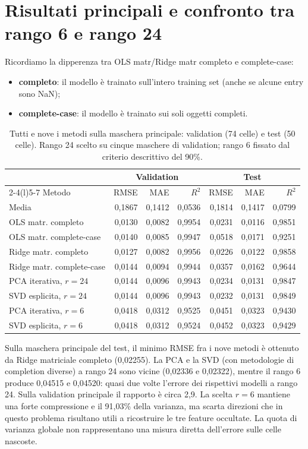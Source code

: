 \documentclass[10pt,a4paper]{article}
\begin{document}
\section{Risultati principali e confronto tra rango 6 e rango 24}
Ricordiamo la dipperenza tra OLS matr/Ridge matr completo e complete-case:
\begin{itemize}
    \item \textbf{completo}: il modello è trainato sull'intero training set (anche se alcune entry sono NaN);
    \item \textbf{complete-case}: il modello è trainato sui soli oggetti completi.
\end{itemize}
\begin{table}[ht]
\centering\scriptsize
\caption{Tutti e nove i metodi sulla maschera principale: validation (74 celle) e test (50 celle). Rango 24 scelto su cinque maschere di validation; rango 6 fissato dal criterio descrittivo del 90\%.}
\label{tab:all-results}
\begin{tabular}{@{}lrrrrrr@{}}
\toprule
& \multicolumn{3}{c}{Validation} & \multicolumn{3}{c}{Test} \\
\cmidrule(lr){2-4}\cmidrule(l){5-7}
Metodo & RMSE & MAE & $R^2$ & RMSE & MAE & $R^2$ \\
\midrule
Media & 0,1867 & 0,1412 & 0,0536 & 0,1814 & 0,1417 & 0,0799 \\
OLS matr. completo & 0,0130 & 0,0082 & 0,9954 & 0,0231 & 0,0116 & 0,9851 \\
OLS matr. complete-case & 0,0140 & 0,0085 & 0,9947 & 0,0518 & 0,0171 & 0,9251 \\
Ridge matr. completo & 0,0127 & 0,0082 & 0,9956 & 0,0226 & 0,0122 & 0,9858 \\
Ridge matr. complete-case & 0,0144 & 0,0094 & 0,9944 & 0,0357 & 0,0162 & 0,9644 \\
PCA iterativa, $r=24$ & 0,0144 & 0,0096 & 0,9943 & 0,0234 & 0,0131 & 0,9847 \\
SVD esplicita, $r=24$ & 0,0144 & 0,0096 & 0,9943 & 0,0232 & 0,0131 & 0,9849 \\
PCA iterativa, $r=6$ & 0,0418 & 0,0312 & 0,9525 & 0,0451 & 0,0323 & 0,9430 \\
SVD esplicita, $r=6$ & 0,0418 & 0,0312 & 0,9524 & 0,0452 & 0,0323 & 0,9429 \\
\bottomrule
\end{tabular}
\end{table}

Sulla maschera principale del test, il minimo RMSE fra i nove metodi è ottenuto da Ridge 
matriciale completo (0,02255). La PCA e la SVD (con metodologie di completion diverse) a 
rango 24 sono vicine (0,02336 e 0,02322), mentre il rango 6 produce 0,04515 e 0,04520: 
quasi due volte l'errore dei rispettivi modelli a rango 24. Sulla validation principale 
il rapporto è circa 2,9. La scelta $r=6$ mantiene una forte compressione e il 91,03\% 
della varianza, ma scarta direzioni che in questo problema risultano utili a ricostruire 
le tre feature occultate. La quota di varianza globale non rappresentano una misura diretta 
dell'errore sulle celle nascoste.
\end{document}
